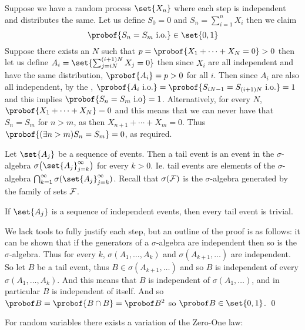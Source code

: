 \eexam

\bexam

    Suppose we have a random process $\set{X_n}$ where each step is independent and distributes the same.
    Let us define $S_0=0$ and $S_n=\sum_{i=1}^n X_i$ then we claim
    $$ \probof{S_n=S_m\hbox{ i.o.}} \in \set{0,1} $$
    Suppose there exists an $N$ such that $p=\probof{X_1+\cdots+X_N=0}>0$ then let us define $A_i=\set{\sum_{j=iN}^{(i+1)N}X_j=0}$ then since $X_i$ are all independent and have the same distribution,
    $\probof{A_i}=p>0$ for all $i$.
    Then since $A_i$ are also all independent, by the , $\probof{A_i\hbox{ i.o.}}=\probof{S_{iN-1}=S_{(i+1)N}\hbox{ i.o.}}=1$ and this implies $\probof{S_n=S_m\hbox{ i.o}}=1$.
    Alternatively, for every $N$, $\probof{X_1+\cdots+X_N}=0$ and this means that we can never have that $S_n=S_m$ for $n>m$, as then $X_{n+1}+\cdots+X_m=0$.
    Thus $\probof{(\exists n>m)S_n=S_m}=0$, as required.

\eexam

\bdefn

    Let $\set{A_j}$ be a sequence of events.
    Then a {\emphcolor tail event} is an event in the $\sigma$-algebra $\sigma\bigl(\set{A_j}_{j=k}^\infty\bigr)$ for every $k>0$.
    Ie. tail events are elements of the $\sigma$-algebra $\bigcap_{k=1}^\infty\sigma(\set{A_j}_{j=k}^\infty)$.
    Recall that $\sigma({\cal F})$ is the $\sigma$-algebra generated by the family of sets ${\cal F}$.

\edefn

\bthrm[title=Kolmogorov's Zero-One Law, name=kolmo01]

    If $\set{A_j}$ is a sequence of independent events, then every tail event is trivial.

\ethrm

We lack tools to fully justify each step, but an outline of the proof is as follows: it can be shown that if the generators of a $\sigma$-algebra are independent then so is the $\sigma$-algebra.
Thus for every $k$, $\sigma(A_1,\dots,A_k)$ and $\sigma(A_{k+1},\dots)$ are independent.
So let $B$ be a tail event, thus $B\in\sigma(A_{k+1},\dots)$ and so $B$ is independent of every $\sigma(A_1,\dots,A_k)$.
And this means that $B$ is independent of $\sigma(A_1,\dots)$, and in particular $B$ is independent of itself.
And so $\probof B=\probof{B\cap B}=\probof B^2$ so $\probof B\in\set{0,1}$.
\qed

For random variables there exists a variation of the Zero-One law:

